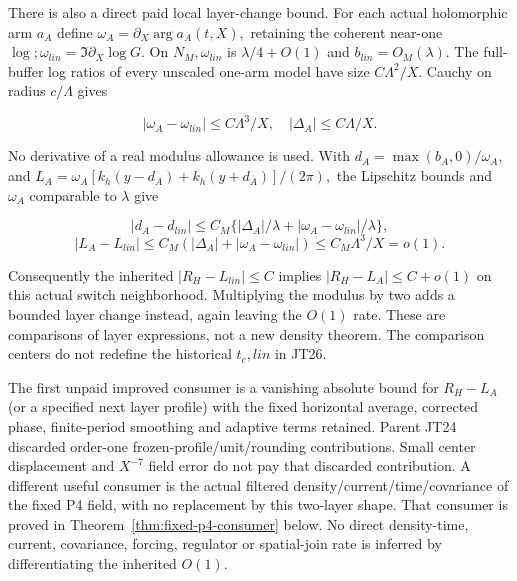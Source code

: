 There is also a direct paid local layer-change bound. For each actual holomorphic arm \(a_{A}\) define \(\omega_{A}=\partial_{X} \arg a_{A}(t,X),\) retaining the coherent near-one \(\log; \omega_{lin}=\Im \partial_{X} \log G.\) On \(N_{M}, \omega_{lin}\) is \(\lambda/4+O(1)\) and \(b_{lin}=O_{M}(\lambda).\) The full-buffer log ratios of every unscaled one-arm model have size \(C \Lambda^{2}/X.\) Cauchy on radius \(c/\Lambda\) gives

\[
|\omega_A-\omega_{lin}|\le C\Lambda^3/X,\quad
|\Delta_A|\le C\Lambda/X.
\tag{NC20}\label{eq:ansatz-nc20}
\]

No derivative of a real modulus allowance is used. With \(d_{A}=\max(b_{A},0)/\omega_{A},\) and \(L_{A}=\omega_{A}[k_{h}(y-d_{A})+k_{h}(y+d_{A})]/(2\pi),\) the Lipschitz bounds and \(\omega_{A}\) comparable to \(\lambda\) give

\[
|d_A-d_{lin}|\le C_M\{ |\Delta_A|/\lambda
                         +|\omega_A-\omega_{lin}|/\lambda\},
\]
\[
|L_A-L_{lin}|\le C_M(|\Delta_A|+|\omega_A-\omega_{lin}|)
                    \le C_M\Lambda^3/X=o(1).
\tag{NC21}\label{eq:ansatz-nc21}
\]

Consequently the inherited \(|R_{H}-L_{lin}|\le C\) implies \(|R_{H}-L_{A}|\le C+o(1)\) on this actual switch neighborhood. Multiplying the modulus by two adds a bounded layer change instead, again leaving the \(O(1)\) rate. These are comparisons of layer expressions, not a new density theorem. The comparison centers do not redefine the historical \(t_{c},lin\) in JT26.

The first unpaid improved consumer is a vanishing absolute bound for \(R_{H}-L_{A}\) (or a specified next layer profile) with the fixed horizontal average, corrected phase, finite-period smoothing and adaptive terms retained. Parent JT24 discarded order-one frozen-profile/unit/rounding contributions. Small center displacement and \(X^{-7}\) field error do not pay that discarded contribution. A different useful consumer is the actual filtered density/current/time/covariance of the fixed P4 field, with no replacement by this two-layer shape. That consumer is proved in Theorem~\ref{thm:fixed-p4-consumer} below. No direct density-time, current, covariance, forcing, regulator or spatial-join rate is inferred by differentiating the inherited \(O(1).\)


